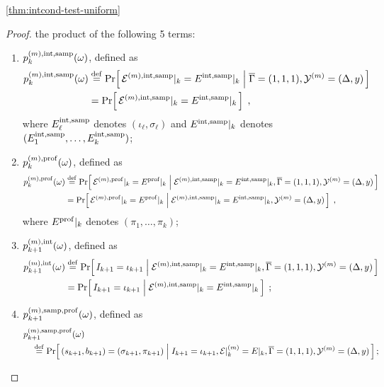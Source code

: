 \begin{proofof}{\cref{thm:intcond-test-uniform}}
\begin{proof}
the product of the following 5 terms:
\begin{enumerate}
\renewcommand{\theenumi}{T\arabic{enumi}}
\renewcommand{\labelenumi}{(\theenumi)}
  \item\label{item:T1} $p^{(m),\rm int, samp}_k(\omega)$, defined as
    \begin{align*}
    p^{(m),\rm int, samp}_k(\omega)
      &\stackrel{\rm def}{=} \Pr\!\left[\, \mathcal{E}^{(m), \rm int, samp}|_k = E^{\rm int, samp}|_k \;\middle\vert\;  \overline{\Gamma} = (1,1,1), \mathcal{Y}^{(m)}=(\Delta,y) \, \right] \\
      &= \Pr\!\left[\, \mathcal{E}^{(m), \rm int, samp}|_k = E^{\rm int, samp}|_k\, \right] \;,
  \end{align*}
  where $E^{\rm int, samp}_\ell$ denotes $(\iota_\ell,\sigma_\ell)$
  and $E^{\rm int, samp}|_k$ denotes $(E^{\rm int, samp}_1,\dots,E^{\rm int, samp}_k)$;
\item\label{item:T2} $p^{(m), \rm prof}_k(\omega)$, defined as
  \begin{align*}
   p^{(m),\rm prof}_k(\omega)
      &\stackrel{\rm def}{=} \Pr\!\left[\, \mathcal{E}^{(m),\rm prof}|_k = E^{\rm prof}|_k \;\middle\vert\; \mathcal{E}^{(m),\rm int, samp}|_k = E^{\rm int, samp}|_k, \overline{\Gamma} = (1,1,1), \mathcal{Y}^{(m)}=(\Delta,y) \, \right] \\
      &= \Pr\!\left[\, \mathcal{E}^{(m),\rm prof}|_k = E^{\rm prof}|_k \;\middle\vert\; \mathcal{E}^{(m),\rm int, samp}|_k = E^{\rm int, samp}|_k, \mathcal{Y}^{(m)}=(\Delta,y) \, \right]\;,
  \end{align*}
  where $E^{\rm prof}|_k$ denotes $(\pi_1,\dots,\pi_k)$;
\item\label{item:T3} $p^{(m), \rm int}_{k+1}(\omega)$, defined as
  \begin{align*}
    p^{(m),\rm int}_{k+1}(\omega)
      &\stackrel{\rm def}{=} \Pr\!\left[\, I_{k+1} = \iota_{k+1} \;\middle\vert\; \mathcal{E}^{(m),\rm int, samp}|_k = E^{\rm int, samp}|_k, \overline{\Gamma} = (1,1,1), \mathcal{Y}^{(m)}=(\Delta,y) \, \right] \\
      &= \Pr\!\left[\, I_{k+1} = \iota_{k+1} \;\middle\vert\; \mathcal{E}^{(m),\rm int, samp}|_k = E^{\rm int, samp}|_k \, \right]\;;
  \end{align*}
\item\label{item:T4} $p^{(m), \rm samp,prof}_{k+1}(\omega)$, defined as
\begin{align*}
&p^{(m), \rm samp,prof}_{k+1}(\omega) \\
&\quad\stackrel{\rm def}{=} \Pr\!\left[\, (s_{k+1},b_{k+1}) = (\sigma_{k+1}, \pi_{k+1})  \;\middle\vert\;  I_{k+1}=\iota_{k+1}, \mathcal{E}|_{k}^{(m)} = E|_{k}, \overline{\Gamma} = (1,1,1), \mathcal{Y}^{(m)}=(\Delta,y) \, \right];
  \end{align*}

\end{enumerate}
\end{proof}
\end{proofof}
